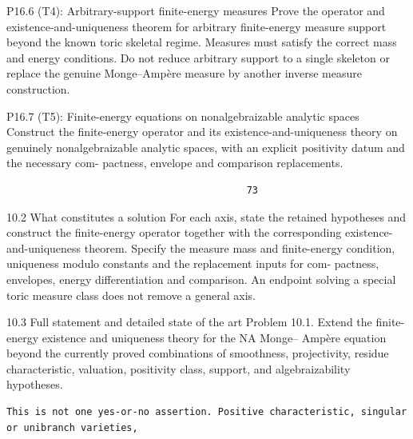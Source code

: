 \documentclass[
  10pt,
]{article}
\begin{document}
P16.6 (T4): Arbitrary-support ﬁnite-energy measures Prove the operator
and existence-and-uniqueness theorem for arbitrary ﬁnite-energy measure
support beyond the known toric skeletal regime. Measures must satisfy
the correct mass and energy conditions. Do not reduce arbitrary support
to a single skeleton or replace the genuine Monge--Ampère measure by
another inverse measure construction.

P16.7 (T5): Finite-energy equations on nonalgebraizable analytic spaces
Construct the ﬁnite-energy operator and its existence-and-uniqueness
theory on genuinely nonalgebraizable analytic spaces, with an explicit
positivity datum and the necessary com- pactness, envelope and
comparison replacements.

\begin{verbatim}
                                          73
\end{verbatim}

10.2 What constitutes a solution For each axis, state the retained
hypotheses and construct the ﬁnite-energy operator together with the
corresponding existence-and-uniqueness theorem. Specify the measure mass
and ﬁnite-energy condition, uniqueness modulo constants and the
replacement inputs for com- pactness, envelopes, energy diﬀerentiation
and comparison. An endpoint solving a special toric measure class does
not remove a general axis.

10.3 Full statement and detailed state of the art Problem 10.1. Extend
the ﬁnite-energy existence and uniqueness theory for the NA Monge--
Ampère equation beyond the currently proved combinations of smoothness,
projectivity, residue characteristic, valuation, positivity class,
support, and algebraizability hypotheses.

\begin{verbatim}
This is not one yes-or-no assertion. Positive characteristic, singular or unibranch varieties,
\end{verbatim}
\end{document}
